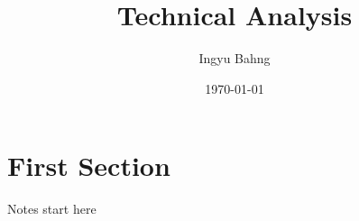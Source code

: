 \documentclass[10pt]{article}
\title{Technical Analysis}
\date{\today}
\author{Ingyu Bahng}
\begin{document}


\section{First Section}

Notes start here
  
\end{document}
